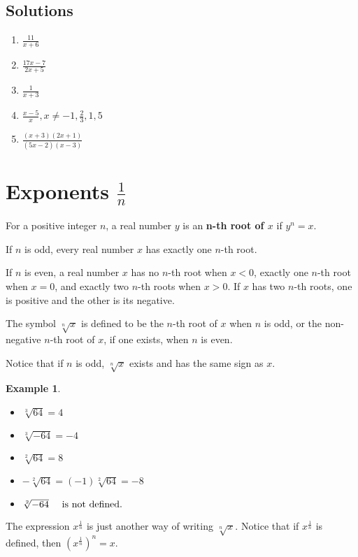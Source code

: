 \documentclass[11pt]{book}               %
\newtheorem{example}{Example}
\begin{document}
\subsection{Solutions} 
\begin{enumerate}
\item  $ \frac{11}{x+6} $  \  \quad
\item  $ \frac{17x-7}{2x+5} $ \ \quad
\item  $  \frac{1}{x+3} $ \  \quad
\item  $\frac{x-5}{x}, x \neq -1, \frac{2}{3}, 1, 5$ \ \quad 
\item $ \frac{(x+3)  (2x+1)}{ (5x-2) (x-3)}$ \ \quad
\end{enumerate}

\newpage
\label{section_reciprocal-exponents}
\section{Exponents $\frac{1}{n}$}

For a positive integer $n$, a real number $y$ is an {\bf n-th root of $x$} if $y^n=x$. 

If $n$ is odd, every real number $x$ has exactly one $n$-th root. 

If $n$ is even, a real number $x$ has no $n$-th root when $x<0$, exactly one $n$-th root when $x=0$, and exactly two $n$-th roots when $x>0$. If $x$ has two $n$-th roots, one is positive and the other is its negative. 

The symbol $\sqrt[n]{x}$ is defined to be the $n$-th root of $x$ when $n$ is odd, or the non-negative $n$-th root of $x$, if one exists, when $n$ is even. 

Notice that if $n$ is odd, $\sqrt[n]{x}$ exists and has the same sign as $x$.

\begin{example}
$ $
\begin{itemize}
\item $ \sqrt[3]{64} = 4$
\item $\sqrt[3]{-64} = -4$
\item $\sqrt[2]{64} = 8$
\item $-\sqrt[2]{64}  = (-1) \sqrt[2]{64} =-8 $ 
\item $\sqrt[2]{-64} \quad\textnormal{ is not defined.}$

\end{itemize}
\end{example}
The expression $x^\frac{1}{n}$ is just another way of writing $\sqrt[n]{x}$. 
Notice that if $x^\frac{1}{n}$ is defined, then  $\left(x^\frac{1}{n}\right)^n=x$. 
\end{document}

